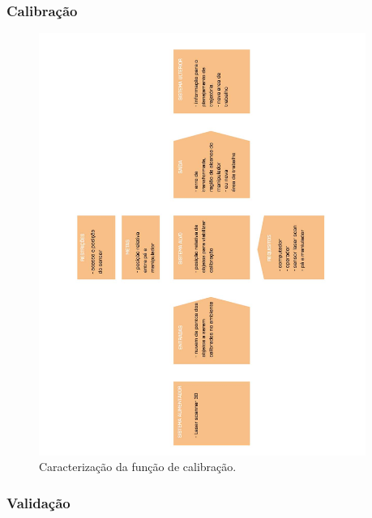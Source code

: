 \documentclass[12pt,a4paper]{article}
\begin{document}
\subsubsection {Calibração}

\begin{figure}[H]
\begin{center}
  \includegraphics[width=0.95\textwidth]{figs/caracterizacao_calibracao.jpg}
  \caption{Caracterização da função de calibração.}
  \label{fig:caracterizacao_calibracao}
\end{center}
\end{figure} 

\subsubsection {Validação}
\end{document}
